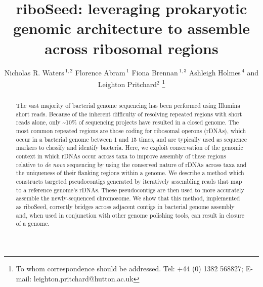 \documentclass[a4,center,fleqn]{NAR}
\begin{document}
\title{riboSeed: leveraging prokaryotic genomic architecture to assemble across ribosomal regions}

\author{%
  Nicholas R. Waters\,$^{1,2}$
  Florence Abram\,$^{1}$
  Fiona Brennan\,$^{1,3}$
  Ashleigh Holmes\,$^{4}$
  and Leighton Pritchard$^{2}$
  \footnote{To whom correspondence should be addressed.
      Tel: +44 (0) 1382 568827; E-mail: leighton.pritchard@hutton.ac.uk
  }
}
\address{
  $^{1}$Department of Microbiology, School of Natural Sciences, National University of Ireland, Galway, Ireland \\
  $^{2}$Information and Computational Sciences, James Hutton Institute, Invergowrie, Dundee DD2 5DA, Scotland\\
  $^{3}$Soil and Environmental Microbiology, Environmental Research Centre, Teagasc, Johnstown Castle, Wexford, Ireland\\
  $^{4}$Cell and Molecular Sciences, James Hutton Institute, Invergowrie, Dundee DD2 5DA, Scotland\\
}


\maketitle

\begin{abstract}
The vast majority of bacterial genome sequencing has been performed using Illumina short reads. Because of the inherent difficulty of resolving repeated regions with short reads alone, only \textasciitilde10\% of sequencing projects have resulted in a closed genome. The most common repeated regions are those coding for ribosomal operons (rDNAs), which occur in a bacterial genome between 1 and 15 times, and are typically used as sequence markers to classify and identify bacteria. Here, we exploit conservation of the genomic context in which rDNAs occur across taxa to improve assembly of these regions relative to \textit{de novo} sequencing by using the conserved nature of rDNAs across taxa and the uniqueness of their flanking regions within a genome. We describe a method which constructs targeted pseudocontigs generated by iteratively assembling reads that map to a reference genome's rDNAs. These pseudocontigs are then used to more accurately assemble the newly-sequenced chromosome. We show that this method, implemented as riboSeed, correctly bridges across adjacent contigs in bacterial genome assembly and, when used in conjunction with other genome polishing tools, can result in closure of a genome.
\end{abstract}
\end{document}
